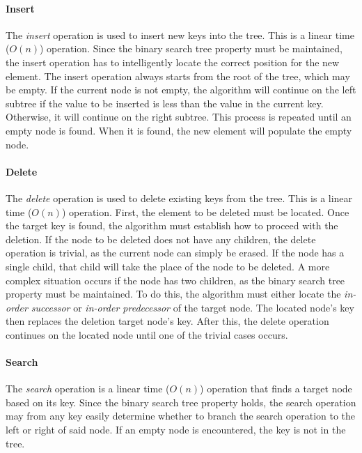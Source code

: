 \documentclass{article}
\begin{document}


\paragraph{Insert}
The {\em insert} operation is used to insert new keys into the tree. This is a linear time (\(O(n)\)) operation.
Since the binary search tree property must be maintained, the insert operation has to intelligently locate the
correct position for the new element. The insert operation always starts from the root of the tree,
which may be empty. If the current node is not empty, the algorithm will continue on the left subtree if
the value to be inserted is less than the value in the current key. Otherwise, it will continue on the right
subtree. This process is repeated until an empty node is found. When it is found, the new element will populate
the empty node.

\paragraph{Delete}
The {\em delete} operation is used to delete existing keys from the tree. This is a linear time (\(O(n)\))
operation. First, the element to be deleted must be located. Once the target key is found, the algorithm must
establish how to proceed with the deletion. If the node to be deleted does not have any children, the delete
operation is trivial, as the current node can simply be erased. If the node has a single child, that child will
take the place of the node to be deleted. A more complex situation occurs if the node has two children, as the
binary search tree property must be maintained. To do this, the algorithm must either locate the
{\em in-order successor} or {\em in-order predecessor} of the target node. The located node's key then replaces
the deletion target node's key. After this, the delete operation continues on the located node until one of the
trivial cases occurs.

\paragraph{Search}
The {\em search} operation is a linear time (\(O(n)\)) operation that finds a target node based on its key.
Since the binary search tree property holds, the search operation may from any key easily determine whether to
branch the search operation to the left or right of said node. If an empty node is encountered, the key is
not in the tree.
\end{document}
